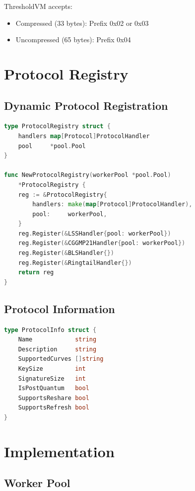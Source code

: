 \documentclass[11pt,twocolumn]{article}
\begin{document}
ThresholdVM accepts:
\begin{itemize}
\item Compressed (33 bytes): Prefix 0x02 or 0x03
\item Uncompressed (65 bytes): Prefix 0x04
\end{itemize}

\section{Protocol Registry}

\subsection{Dynamic Protocol Registration}

\begin{lstlisting}[language=Go,basicstyle=\ttfamily\small]
type ProtocolRegistry struct {
    handlers map[Protocol]ProtocolHandler
    pool     *pool.Pool
}

func NewProtocolRegistry(workerPool *pool.Pool)
    *ProtocolRegistry {
    reg := &ProtocolRegistry{
        handlers: make(map[Protocol]ProtocolHandler),
        pool:     workerPool,
    }
    reg.Register(&LSSHandler{pool: workerPool})
    reg.Register(&CGGMP21Handler{pool: workerPool})
    reg.Register(&BLSHandler{})
    reg.Register(&RingtailHandler{})
    return reg
}
\end{lstlisting}

\subsection{Protocol Information}

\begin{lstlisting}[language=Go,basicstyle=\ttfamily\small]
type ProtocolInfo struct {
    Name            string
    Description     string
    SupportedCurves []string
    KeySize         int
    SignatureSize   int
    IsPostQuantum   bool
    SupportsReshare bool
    SupportsRefresh bool
}
\end{lstlisting}

\section{Implementation}

\subsection{Worker Pool}
\end{document}
